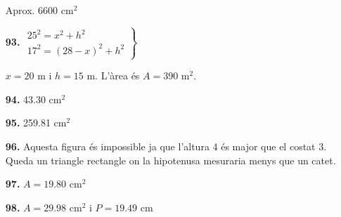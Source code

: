 \documentclass[a4paper, pdf, twoside]{book}
\begin{document}
\begin{multicols}{2}
\begin{enumerate}
Aprox. 6600 cm$^2$
\vspace{0.25cm}
\item[\fontfamily{phv}\selectfont\color{blue}\textbf{93. }] 
$\left . \begin {array}{l} 25^2=x^2+h^2 \\ 17^2 =(28-x)^2+h^2 \end {array} \right \}$ \par $x=20$ m i $h=15$ m. L'àrea és $A=390$ m$^2$.
\vspace{0.25cm}
\item[\fontfamily{phv}\selectfont\color{blue}\textbf{94. }] 
43.30 cm$^2$
\vspace{0.25cm}
\item[\fontfamily{phv}\selectfont\color{blue}\textbf{95. }] 
259.81 cm$^2$
\vspace{0.25cm}
\item[\fontfamily{phv}\selectfont\color{blue}\textbf{96. }] 
Aquesta figura és impossible ja que l'altura 4 és major que el costat 3. Queda un triangle rectangle on la hipotenusa mesuraria menys que un catet.
\vspace{0.25cm}
\item[\fontfamily{phv}\selectfont\color{blue}\textbf{97. }] 
$A=19.80$ cm$^2$
\vspace{0.25cm}
\item[\fontfamily{phv}\selectfont\color{blue}\textbf{98. }] 
$A=29.98$ cm$^2$ i $P=19.49$ cm
 \end{enumerate}
\vspace{0.3cm}



\end{multicols}
\end{document}
